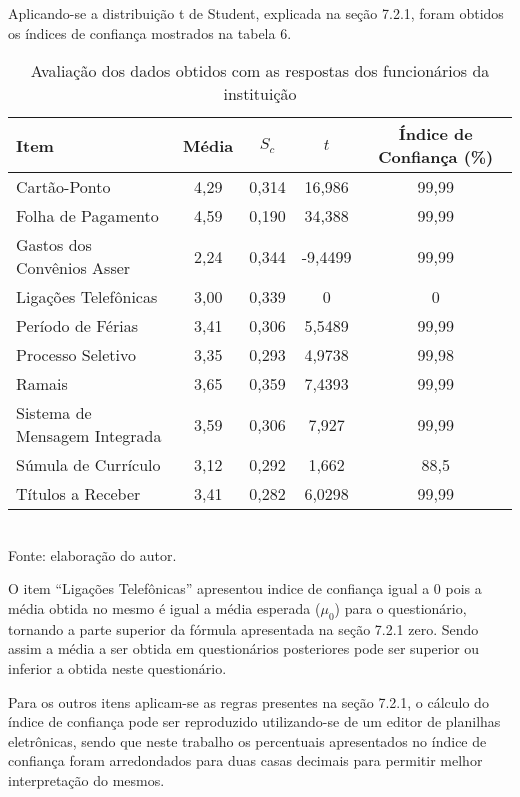 Aplicando-se a distribuição t de Student, explicada na seção 7.2.1, foram obtidos os índices de confiança mostrados na tabela 6.

\begin{table}[!hbt]
\centering
\caption[Avaliação dos dados obtidos - Funcionário]{Avaliação dos dados obtidos com as respostas dos funcionários da instituição}
\vspace{3mm}
\begin{tabular}{p{5cm}|c|c|c|c}\hline
\textbf{Item} & \textbf{Média} & \textbf{$S_c$} & \textbf{$t$} & \textbf{Índice de Confiança (\%)} \\ \hline
Cartão-Ponto & 4,29 & 0,314 & 16,986 & 99,99 \\ \hline
Folha de Pagamento & 4,59 & 0,190 & 34,388 & 99,99 \\ \hline
Gastos dos Convênios Asser & 2,24 & 0,344 & -9,4499 & 99,99 \\ \hline
Ligações Telefônicas & 3,00 & 0,339 & 0 & 0 \\ \hline
Período de Férias & 3,41 & 0,306 & 5,5489 & 99,99 \\ \hline
Processo Seletivo & 3,35 & 0,293 & 4,9738 & 99,98 \\ \hline
Ramais & 3,65 & 0,359 & 7,4393 & 99,99 \\ \hline
Sistema de Mensagem Integrada & 3,59 & 0,306 & 7,927 & 99,99\\ \hline
Súmula de Currículo & 3,12 & 0,292 & 1,662 & 88,5 \\ \hline
Títulos a Receber & 3,41 & 0,282 & 6,0298 & 99,99 \\ \hline
\end{tabular}
\\ Fonte: elaboração do autor.
\end{table}

O item “Ligações Telefônicas'' apresentou indice de confiança igual a 0 pois a média obtida no mesmo é igual a média esperada ($\mu_0$) para o questionário, tornando a parte superior da fórmula apresentada na seção 7.2.1 zero. Sendo assim a média a ser obtida em questionários posteriores pode ser superior ou inferior a obtida neste questionário.

Para os outros itens aplicam-se as regras presentes na seção 7.2.1, o cálculo do índice de confiança pode ser reproduzido utilizando-se de um editor de planilhas eletrônicas, sendo que neste trabalho os percentuais apresentados no índice de confiança foram arredondados para duas casas decimais para permitir melhor interpretação do mesmos. 

